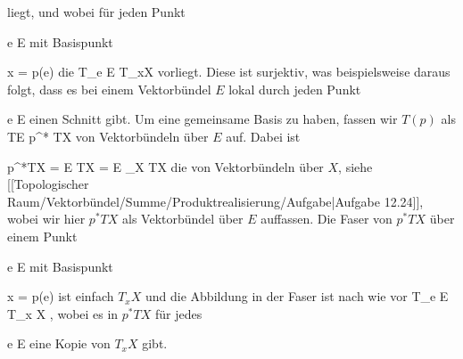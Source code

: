  {  }

liegt, und wobei für jeden Punkt

\mavergleichskette
{\vergleichskette
{ e
}
{ \in }{ E
}
{  }{
}
{    }{
}
{   }{
}
}
{}{}{}
mit Basispunkt

\mavergleichskette
{\vergleichskette
{ x
}
{ = }{ p(e)
}
{  }{
}
{    }{
}
{   }{
}
}
{}{}{}
die
 {T_e E} { T_{x}X
} {}
vorliegt. Diese ist surjektiv, was beispielsweise daraus folgt, dass es bei einem Vektorbündel $E$ lokal durch jeden Punkt

\mavergleichskette
{\vergleichskette
{ e
}
{ \in }{ E
}
{  }{
}
{    }{
}
{   }{
}
}
{}{}{}
einen Schnitt gibt. Um eine gemeinsame Basis zu haben, fassen wir $T(p)$ als
 {TE} { p^* TX
} {}
von Vektorbündeln über $E$ auf. Dabei ist

\mavergleichskettedisp
{\vergleichskette
{ p^*TX
}
{ =} { E \oplus TX
}
{ =} { E \times_X TX
}
{ } {
}
{ } {
}
}
{}{}{}
die
von Vektorbündeln über $X$, siehe
[[Topologischer Raum/Vektorbündel/Summe/Produktrealisierung/Aufgabe|Aufgabe 12.24]],
wobei wir hier $p^*TX$ als Vektorbündel über $E$ auffassen. Die Faser von $p^*TX$ über einem Punkt

\mavergleichskette
{\vergleichskette
{ e
}
{ \in }{ E
}
{  }{
}
{    }{
}
{   }{
}
}
{}{}{}
mit Basispunkt

\mavergleichskette
{\vergleichskette
{ x
}
{ = }{ p(e)
}
{  }{
}
{    }{
}
{   }{
}
}
{}{}{}
ist einfach $T_{x}X$ und die Abbildung in der Faser ist nach wie vor
 { T_e E } { T_{x} X
} {,}
wobei es in $p^*TX$ für jedes

\mavergleichskette
{\vergleichskette
{ e
}
{ \in }{ E
}
{  }{
}
{    }{
}
{   }{
}
}
{}{}{}
eine Kopie von $T_{x} X$ gibt.

